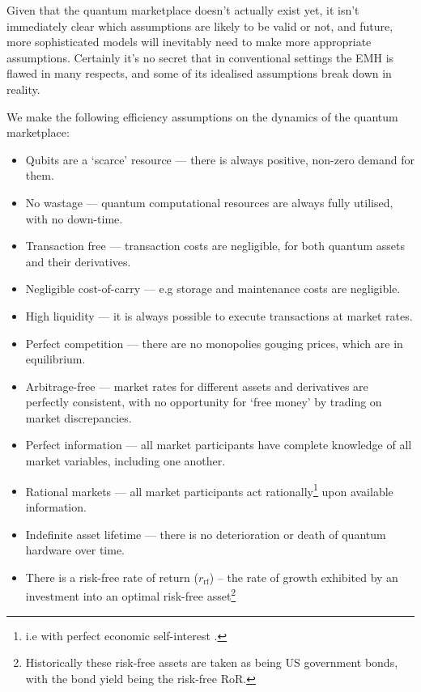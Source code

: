 Given that the quantum marketplace doesn't actually exist yet, it isn't immediately clear which assumptions are likely to be valid or not, and future, more sophisticated models will inevitably need to make more appropriate assumptions. Certainly it's no secret that in conventional settings the EMH is flawed in many respects, and some of its idealised assumptions break down in reality.

\begin{postulate}\label{post:market_eff} We make the following efficiency assumptions on the dynamics of the quantum marketplace:
\begin{itemize}
	\item Qubits are a `scarce' resource --- there is always positive, non-zero demand for them.
	\item No wastage --- quantum computational resources are always fully utilised, with no down-time.
	\item Transaction free --- transaction costs are negligible, for both quantum assets and their derivatives.
	\item Negligible cost-of-carry --- e.g storage and maintenance costs are negligible.
	\item High liquidity --- it is always possible to execute transactions at market rates.
	\item Perfect competition --- there are no monopolies gouging prices, which are in equilibrium.
	\item Arbitrage-free --- market rates for different assets and derivatives are perfectly consistent, with no opportunity for `free money' by trading on market discrepancies.
	\item Perfect information --- all market participants have complete knowledge of all market variables, including one another.
	\item Rational markets --- all market participants act rationally\footnote{i.e with perfect economic self-interest .} upon available information.
	\item Indefinite asset lifetime --- there is no deterioration or death of quantum hardware over time.
	\item There is a risk-free rate of return ($r_\text{rf}$)
-- the rate of growth exhibited by an investment into an optimal risk-free asset\footnote{Historically these risk-free assets are taken as being US government bonds, with the bond yield being the risk-free RoR.}
	\end{itemize}
\end{postulate}

